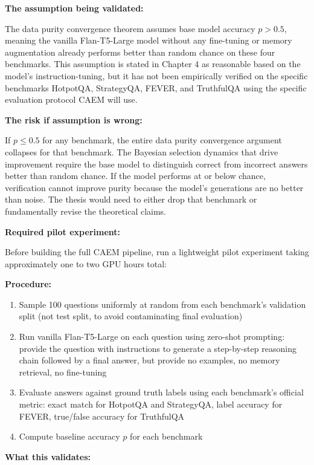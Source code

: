 \documentclass[11pt,a4paper]{article}
\newcommand{\implementbox}[2]{%
\begin{tcolorbox}[enhanced,breakable,
  colback=LightSlate,colframe=Slate,boxrule=1.5pt,arc=4pt,
  left=8pt,right=8pt,top=6pt,bottom=6pt,
  title={\bfseries\small\color{white}#1},
  attach boxed title to top left={yshift=-2mm,xshift=6mm},
  boxed title style={colback=Slate,arc=3pt,boxrule=0pt,
    left=4pt,right=4pt,top=2pt,bottom=2pt}]
#2
\end{tcolorbox}}
\begin{document}
\implementbox{IMPLEMENTATION CONCERN 1: Pre-Implementation Pilot to Validate Base Assumptions}{
\textbf{The assumption being validated:}

The data purity convergence theorem assumes base model accuracy $p > 0.5$, meaning the vanilla Flan-T5-Large model without any fine-tuning or memory augmentation already performs better than random chance on these four benchmarks. This assumption is stated in Chapter 4 as reasonable based on the model's instruction-tuning, but it has not been empirically verified on the specific benchmarks HotpotQA, StrategyQA, FEVER, and TruthfulQA using the specific evaluation protocol CAEM will use.

\textbf{The risk if assumption is wrong:}

If $p \leq 0.5$ for any benchmark, the entire data purity convergence argument collapses for that benchmark. The Bayesian selection dynamics that drive improvement require the base model to distinguish correct from incorrect answers better than random chance. If the model performs at or below chance, verification cannot improve purity because the model's generations are no better than noise. The thesis would need to either drop that benchmark or fundamentally revise the theoretical claims.

\textbf{Required pilot experiment:}

Before building the full CAEM pipeline, run a lightweight pilot experiment taking approximately one to two GPU hours total:

\textbf{Procedure:}
\begin{enumerate}
\item Sample 100 questions uniformly at random from each benchmark's validation split (not test split, to avoid contaminating final evaluation)
\item Run vanilla Flan-T5-Large on each question using zero-shot prompting: provide the question with instructions to generate a step-by-step reasoning chain followed by a final answer, but provide no examples, no memory retrieval, no fine-tuning
\item Evaluate answers against ground truth labels using each benchmark's official metric: exact match for HotpotQA and StrategyQA, label accuracy for FEVER, true/false accuracy for TruthfulQA
\item Compute baseline accuracy $p$ for each benchmark
\end{enumerate}

\textbf{What this validates:}

}
\end{document}
